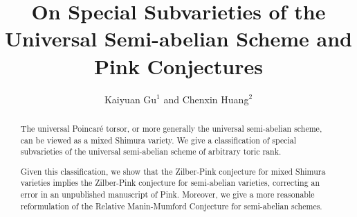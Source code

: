 \documentclass[10pt, reqno]{amsart}
\theoremstyle{definition}
\theoremstyle{remark}
\numberwithin{equation}{section}
\begin{document}
\setcounter{page}{1}

\noindent 

\centerline{}

\centerline{}

\title[\scalebox{.8}{On Special Subvarieties of the Universal Semi-abelian Scheme and Pink Conjectures}]{On Special Subvarieties of the Universal Semi-abelian Scheme and Pink Conjectures}

\author{Kaiyuan Gu$^1$ and Chenxin Huang$^2$}

\address{$^{1}$ School of Mathematical Sciences, Peking University, Beijing, China.}
\email{\textcolor{MK_One_Five}{gky@stu.pku.edu.cn}}

\address{$^{2}$ School of Mathematical Sciences, Fudan University, Shanghai, China.}
\email{\textcolor{MK_One_Five}{cxhuang21@m.fudan.edu.cn}}





\begin{abstract}
The universal Poincar\'{e} torsor, or more generally the universal semi-abelian scheme, can be viewed as a mixed Shimura variety. We give a classification of special subvarieties of the universal semi-abelian scheme of arbitrary toric rank. 

Given this classification, we show that the Zilber-Pink conjecture for mixed Shimura varieties implies the Zilber-Pink conjecture for semi-abelian varieties, correcting an error in an unpublished manuscript of Pink. Moreover, we give a more reasonable reformulation of the Relative Manin-Mumford Conjecture for semi-abelian schemes.

\end{abstract} \maketitle
\parskip=0.5pt
\small
\tableofcontents
\normalsize
\parskip=2pt
\setlength{\parindent}{2em}









\end{document}
